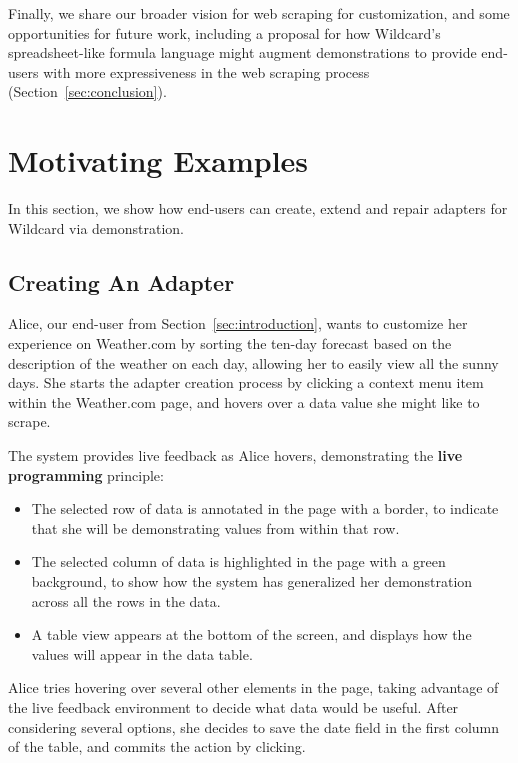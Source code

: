 \documentclass[sigconf,10pt]{acmart}
\providecommand{\tightlist}{%
  \setlength{\itemsep}{0pt}\setlength{\parskip}{0pt}}
\begin{document}
Finally, we share our broader vision for web scraping for customization,
and some opportunities for future work, including a proposal for how
Wildcard's spreadsheet-like formula language might augment
demonstrations to provide end-users with more expressiveness in the web
scraping process (Section~\ref{sec:conclusion}).

\hypertarget{sec:demos}{%
\section{Motivating Examples}\label{sec:demos}}

In this section, we show how end-users can create, extend and repair
adapters for Wildcard via demonstration.

\hypertarget{creating-an-adapter}{%
\subsection{Creating An Adapter}\label{creating-an-adapter}}

Alice, our end-user from Section~\ref{sec:introduction}, wants to
customize her experience on Weather.com by sorting the ten-day forecast
based on the description of the weather on each day, allowing her to
easily view all the sunny days. She starts the adapter creation process
by clicking a context menu item within the Weather.com page, and hovers
over a data value she might like to scrape.

The system provides live feedback as Alice hovers, demonstrating the
\textbf{live programming} principle:

\begin{itemize}
\tightlist
\item
  The selected row of data is annotated in the page with a border, to
  indicate that she will be demonstrating values from within that row.
\item
  The selected column of data is highlighted in the page with a green
  background, to show how the system has generalized her demonstration
  across all the rows in the data.
\item
  A table view appears at the bottom of the screen, and displays how the
  values will appear in the data table.
\end{itemize}

Alice tries hovering over several other elements in the page, taking
advantage of the live feedback environment to decide what data would be
useful. After considering several options, she decides to save the date
field in the first column of the table, and commits the action by
clicking.
\end{document}
